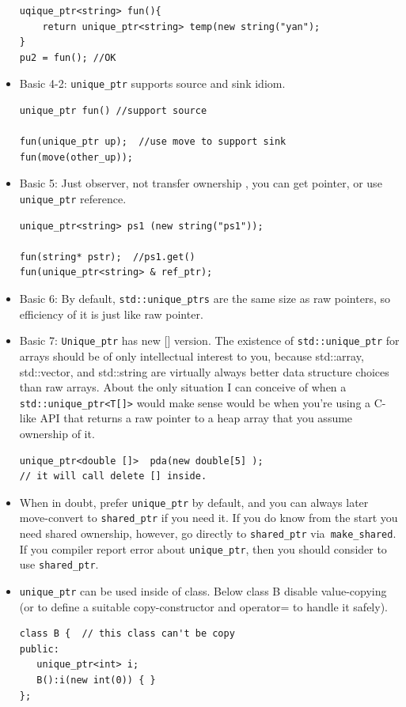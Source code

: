 \documentclass[a4paper,11pt,twoside]{book}
\begin{document}
\begin{itemize}
\begin{lstlisting}[numbers=none]
uqique_ptr<string> fun(){
	return unique_ptr<string> temp(new string("yan");
}
pu2 = fun(); //OK
\end{lstlisting}

\item Basic 4-2: \texttt{unique\_ptr} supports source and sink idiom.
\begin{lstlisting}[numbers=none]
unique_ptr fun() //support source

fun(unique_ptr up);  //use move to support sink
fun(move(other_up));
\end{lstlisting}

\item Basic 5: Just observer, not transfer ownership , you can get pointer, or use \texttt{unique\_ptr} reference.
\begin{lstlisting}[numbers=none]
unique_ptr<string> ps1 (new string("ps1"));

fun(string* pstr);  //ps1.get()
fun(unique_ptr<string> & ref_ptr);
\end{lstlisting}

\item Basic 6: By default, \texttt{std::unique\_ptrs} are the same size as raw pointers, so efficiency of it is just like raw pointer.

\item Basic 7: \texttt{Unique\_ptr} has new [] version. The existence of \texttt{std::unique\_ptr} for arrays should be of only intellectual interest to you, because std::array, std::vector, and std::string are virtually always better data structure choices than raw arrays. About the only situation I can conceive of when a \texttt{std::unique\_ptr<T[]>} would make sense would be when you're using a C-like API that returns a raw pointer to a heap array that you assume ownership of it.
\begin{lstlisting}[numbers=none]
unique_ptr<double []>  pda(new double[5] );
// it will call delete [] inside.
\end{lstlisting}

\item When in doubt, prefer \texttt{unique\_ptr} by default, and you can always later move-convert to \texttt{shared\_ptr} if you need it. If you do know from the start you need shared ownership, however, go directly to \texttt{shared\_ptr} via\texttt{ make\_shared}. If you compiler report error about \texttt{unique\_ptr}, then you should consider to use \texttt{shared\_ptr}.

\item \texttt{unique\_ptr} can be used inside of class. Below class B disable value-copying (or to define a suitable copy-constructor  and operator= to handle it safely).
\begin{lstlisting}[numbers=none]
class B {  // this class can't be copy
public:
   unique_ptr<int> i;
   B():i(new int(0)) { }
};
\end{lstlisting}


\end{itemize}
\end{document}
